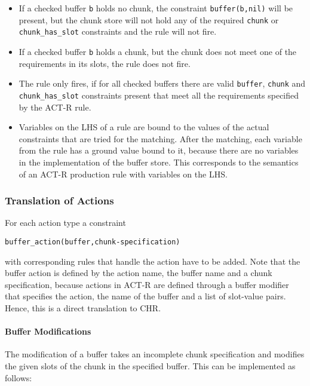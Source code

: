 \begin{itemize}
 \item If a checked buffer \lstinline|b| holds no chunk, the constraint \lstinline|buffer(b,nil)| will be present, but the chunk store will not hold any of the required \lstinline|chunk| or \lstinline|chunk_has_slot| constraints and the rule will not fire.
 \item If a checked buffer \lstinline|b| holds a chunk, but the chunk does not meet one of the requirements in its slots, the rule does not fire.
 \item The rule only fires, if for all checked buffers there are valid \lstinline|buffer|, \lstinline|chunk| and \lstinline|chunk_has_slot| constraints present that meet all the requirements specified by the ACT-R rule.
 \item Variables on the LHS of a rule are bound to the values of the actual constraints that are tried for the matching. After the matching, each variable from the rule has a ground value bound to it, because there are no variables in the implementation of the buffer store. This corresponds to the semantics of an ACT-R production rule with variables on the LHS.
\end{itemize}

\subsubsection{Translation of Actions}
\label{translation_of_actions}

For each action type a constraint

\begin{lstlisting}
buffer_action(buffer,chunk-specification)
\end{lstlisting}

with corresponding rules that handle the action have to be added. Note that the buffer action is defined by the action name, the buffer name and a chunk specification, because actions in ACT-R are defined through a buffer modifier that specifies the action, the name of the buffer and a list of slot-value pairs. Hence, this is a direct translation to CHR.

\paragraph{Buffer Modifications}

The modification of a buffer takes an incomplete chunk specification and modifies the given slots of the chunk in the specified buffer. This can be implemented as follows:

